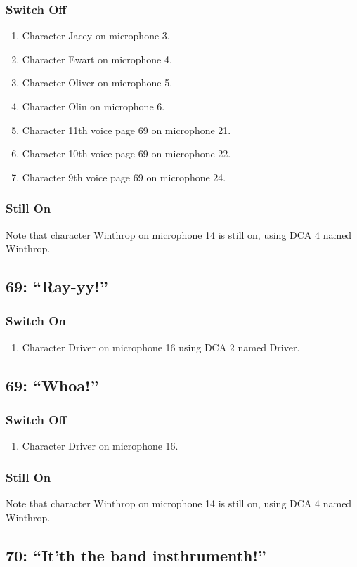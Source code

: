 \subsubsection* {Switch Off}
\begin{enumerate}
\item Character Jacey on microphone 3.
\item Character Ewart on microphone 4.
\item Character Oliver on microphone 5.
\item Character Olin on microphone 6.
\item Character 11th voice page 69 on microphone 21.
\item Character 10th voice page 69 on microphone 22.
\item Character 9th voice page 69 on microphone 24.
\end{enumerate}
\subsubsection* {Still On}
Note that character Winthrop on microphone 14 is still on, using DCA 4 named Winthrop.\subsection* {69: ``Ray-yy!''}
\subsubsection* {Switch On}
\begin{enumerate}
\item Character Driver on microphone 16 using DCA 2 named Driver.
\end{enumerate}
\subsection* {69: ``Whoa!''}
\subsubsection* {Switch Off}
\begin{enumerate}
\item Character Driver on microphone 16.
\end{enumerate}
\subsubsection* {Still On}
Note that character Winthrop on microphone 14 is still on, using DCA 4 named Winthrop.\subsection* {70: ``It'th the band insthrumenth!''}
